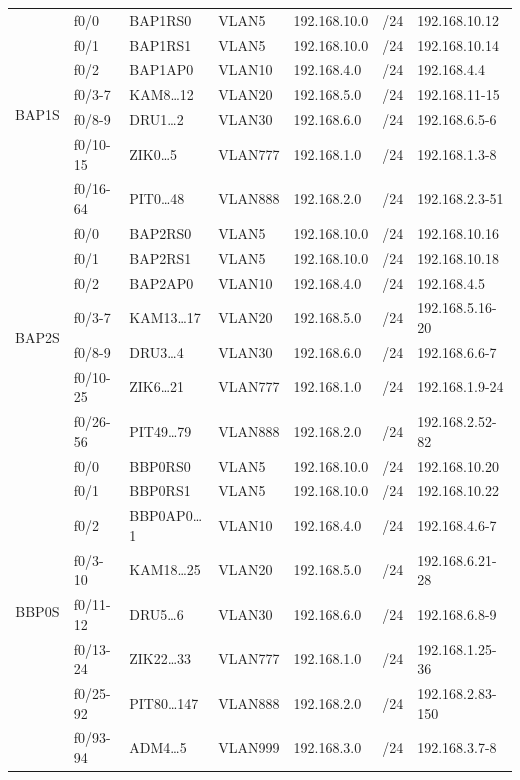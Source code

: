 \documentclass[12pt,a4paper,titlepage]{article}
\begin{document}
{\begin{longtable}{|c|l|l|l|l|c|l|}
    \multirow{7}{*}{BAP1S}
    & f0/0 & BAP1RS0 & VLAN5 & 192.168.10.0 & /24 & 192.168.10.12
\\
    \cline{2-7}
    & f0/1 & BAP1RS1 & VLAN5 & 192.168.10.0 & /24 & 192.168.10.14
 \\
    \cline{2-7}
    & f0/2 & BAP1AP0 & VLAN10 & 192.168.4.0 & /24 & 192.168.4.4
 \\
    \cline{2-7}
    & f0/3-7 & KAM8…12 & VLAN20 & 192.168.5.0 & /24 & 192.168.11-15
 \\
    \cline{2-7}
    & f0/8-9 & DRU1…2 & VLAN30 & 192.168.6.0 & /24 & 192.168.6.5-6
 \\
    \cline{2-7}
    & f0/10-15 & ZIK0…5 & VLAN777 & 192.168.1.0 & /24 & 192.168.1.3-8
 \\
    \cline{2-7}
    & f0/16-64 & PIT0…48 & VLAN888 & 192.168.2.0 & /24 & 192.168.2.3-51
 \\
    \hline
    
    \multirow{7}{*}{BAP2S}
    & f0/0 & BAP2RS0 & VLAN5 & 192.168.10.0 & /24 & 192.168.10.16
 \\
    \cline{2-7}
    & f0/1 & BAP2RS1 & VLAN5 & 192.168.10.0 & /24 & 192.168.10.18
 \\
    \cline{2-7}
    & f0/2 & BAP2AP0 & VLAN10 & 192.168.4.0 & /24 & 192.168.4.5
 \\
    \cline{2-7}
    & f0/3-7 & KAM13…17 & VLAN20 & 192.168.5.0 & /24 & 192.168.5.16-20
 \\
    \cline{2-7}
    & f0/8-9 & DRU3…4 & VLAN30 & 192.168.6.0 & /24 & 192.168.6.6-7
 \\
    \cline{2-7}
    & f0/10-25 & ZIK6…21 & VLAN777 & 192.168.1.0 & /24 & 192.168.1.9-24
 \\
    \cline{2-7}
    & f0/26-56 & PIT49…79 & VLAN888 & 192.168.2.0 & /24 & 192.168.2.52-82
 \\
    \hline
    
    \multirow{8}{*}{BBP0S}
    & f0/0 & BBP0RS0 & VLAN5 & 192.168.10.0 & /24 & 192.168.10.20
 \\
    \cline{2-7}
    & f0/1 & BBP0RS1 & VLAN5 & 192.168.10.0 & /24 & 192.168.10.22
 \\
    \cline{2-7}
    & f0/2 & BBP0AP0…1 & VLAN10 & 192.168.4.0 & /24 & 192.168.4.6-7
 \\
    \cline{2-7}
    & f0/3-10 & KAM18…25 & VLAN20 & 192.168.5.0 & /24 & 192.168.6.21-28
\\
    \cline{2-7}
    & f0/11-12 & DRU5…6 & VLAN30 & 192.168.6.0 & /24 & 192.168.6.8-9
 \\
    \cline{2-7}
    & f0/13-24 & ZIK22…33 & VLAN777 & 192.168.1.0 & /24 & 192.168.1.25-36
 \\
    \cline{2-7}
    & f0/25-92 & PIT80…147 & VLAN888 & 192.168.2.0 & /24 & 192.168.2.83-150
 \\
    \cline{2-7}
    & f0/93-94 & ADM4…5 & VLAN999 & 192.168.3.0 & /24 & 192.168.3.7-8
 \\
    \hline
\end{longtable}}
\end{document}
